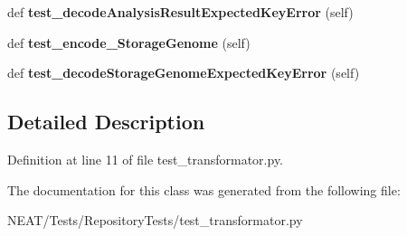 \begin{DoxyCompactItemize}
\item 
def {\bfseries test\+\_\+decode\+Analysis\+Result\+Expected\+Key\+Error} (self)\hypertarget{class_n_e_a_t___py_genetics_1_1_n_e_a_t_1_1_tests_1_1_repository_tests_1_1test__transformator_1_1_test_transformator_a292de899d817046aa4ec132048a99a8c}{}\label{class_n_e_a_t___py_genetics_1_1_n_e_a_t_1_1_tests_1_1_repository_tests_1_1test__transformator_1_1_test_transformator_a292de899d817046aa4ec132048a99a8c}

\item 
def {\bfseries test\+\_\+encode\+\_\+\+Storage\+Genome} (self)\hypertarget{class_n_e_a_t___py_genetics_1_1_n_e_a_t_1_1_tests_1_1_repository_tests_1_1test__transformator_1_1_test_transformator_aaa29218247a09f3eb22dccc4f9e448bf}{}\label{class_n_e_a_t___py_genetics_1_1_n_e_a_t_1_1_tests_1_1_repository_tests_1_1test__transformator_1_1_test_transformator_aaa29218247a09f3eb22dccc4f9e448bf}

\item 
def {\bfseries test\+\_\+decode\+Storage\+Genome\+Expected\+Key\+Error} (self)\hypertarget{class_n_e_a_t___py_genetics_1_1_n_e_a_t_1_1_tests_1_1_repository_tests_1_1test__transformator_1_1_test_transformator_a4270d9623bdc0174d4b242d96ab68219}{}\label{class_n_e_a_t___py_genetics_1_1_n_e_a_t_1_1_tests_1_1_repository_tests_1_1test__transformator_1_1_test_transformator_a4270d9623bdc0174d4b242d96ab68219}

\end{DoxyCompactItemize}


\subsection{Detailed Description}


Definition at line 11 of file test\+\_\+transformator.\+py.



The documentation for this class was generated from the following file\+:\begin{DoxyCompactItemize}
\item 
N\+E\+A\+T/\+Tests/\+Repository\+Tests/test\+\_\+transformator.\+py\end{DoxyCompactItemize}
